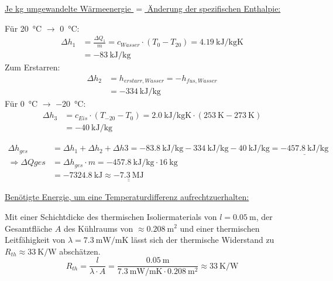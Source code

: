 		\underline{Je kg umgewandelte Wärmeenergie \(=\) Änderung der spezifischen Enthalpie:}\par\medskip
		Für \SI{20}{\celsius} \(\rightarrow\) \SI{0}{\celsius}:
		\begin{align}
			\Delta h_1	&= \frac{\Delta Q_1}{m} = c_{Wasser} \cdot \left(T_0 - T_{20}\right) = \SI{4,19}{\kilo\joule\per\kilo\gram\kelvin}\\%
						&= \SI{-83}{\kilo\joule\per\kilo\gram}
		\end{align}
		Zum Erstarren:
		\begin{align}
			\Delta h_2	&= h_{erstarr,Wasser} = -h_{fus,Wasser} \nonumber \\
						&= \SI{-334}{\kilo\joule\per\kilo\gram}
		\end{align}
		Für \SI{0}{\celsius} \(\rightarrow\) \SI{-20}{\celsius}:
		\begin{align}
			\Delta h_3	&= c_{Eis} \cdot (T_{-20}-T_0) = \SI{2,0}{\kilo\joule\per\kilo\gram\kelvin} \cdot (\SI{253}{\kelvin}-\SI{273}{\kelvin}) \nonumber \\
						&= \SI{-40}{\kilo\joule\per\kilo\gram}
		\end{align}

		\begin{align}
			\Delta h_{ges} 				&= \Delta h_1 + \Delta h_2 + \Delta h3 = \SI{-83,8}{\kilo\joule\per\kilo\gram} - \SI{334}{\kilo\joule\per\kilo\gram} - \SI{40}{\kilo\joule\per\kilo\gram} = \underline{\SI{-457,8}{\kilo\joule\per\kilo\gram}} \nonumber \\
			\Rightarrow \Delta Q{ges} 	&= \Delta h_{ges} \cdot m = \SI{-457,8}{\kilo\joule\per\kilo\gram} \cdot \SI{16}{\kilo\gram} \nonumber \\
										&= \SI{-7324,8}{\kilo\joule} \approx \underline{\underline{\SI{-7,3}{\mega\joule}}}
		\end{align}

		\underline{Benötigte Energie, um eine Temperaturdifferenz aufrechtzuerhalten:}\par\smallskip
		Mit einer Schichtdicke des thermischen Isoliermaterials von \(l = \SI{0,05}{\metre}\), der Gesamtfläche \(A\) des Kühlraums von \(\approx \SI{0,208}{\metre\squared}\)
		und einer thermischen Leitfähigkeit von \(\lambda = \SI{7,3}{\mW\per\metre\kelvin}\) lässt sich der thermische Widerstand zu
		\(R_{th} \approx \SI{33}{\kelvin\per\watt}\) abschätzen.
		\begin{equation}
			R_{th} 	= \frac{l}{\lambda \cdot A} = \frac{\SI{0,05}{\metre}}{\SI{7,3}{\mW\per\metre\kelvin} \cdot \SI{0,208}{\metre\squared}} \approx \SI{33}{\kelvin\per\watt}
		\end{equation}

